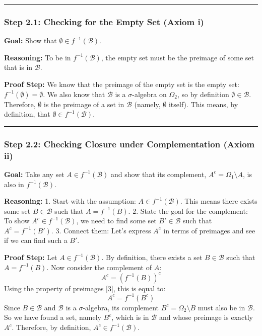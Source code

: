 \documentclass[11pt,a4paper]{article}
\begin{document}
\vspace{1em}
\hrule
\vspace{1em}

\subsubsection*{Step 2.1: Checking for the Empty Set (Axiom i)}
\textbf{Goal:} Show that \(\emptyset \in f^{-1}(\mathcal{B})\).

\textbf{Reasoning:} To be in \(f^{-1}(\mathcal{B})\), the empty set must be the preimage of some set that is in \(\mathcal{B}\).

\textbf{Proof Step:}
We know that the preimage of the empty set is the empty set: \(f^{-1}(\emptyset) = \emptyset\).
We also know that \(\mathcal{B}\) is a \(\sigma\)-algebra on \(\Omega_2\), so by definition \(\emptyset \in \mathcal{B}\).
Therefore, \(\emptyset\) is the preimage of a set in \(\mathcal{B}\) (namely, \(\emptyset\) itself). This means, by definition, that \(\emptyset \in f^{-1}(\mathcal{B})\).

\vspace{1em}
\hrule
\vspace{1em}

\subsubsection*{Step 2.2: Checking Closure under Complementation (Axiom ii)}
\textbf{Goal:} Take any set \(A \in f^{-1}(\mathcal{B})\) and show that its complement, \(A^c = \Omega_1 \setminus A\), is also in \(f^{-1}(\mathcal{B})\).

\textbf{Reasoning:}
1. Start with the assumption: \(A \in f^{-1}(\mathcal{B})\). This means there exists some set \(B \in \mathcal{B}\) such that \(A = f^{-1}(B)\).
2. State the goal for the complement: To show \(A^c \in f^{-1}(\mathcal{B})\), we need to find some set \(B' \in \mathcal{B}\) such that \(A^c = f^{-1}(B')\).
3. Connect them: Let's express \(A^c\) in terms of preimages and see if we can find such a \(B'\).

\textbf{Proof Step:}
Let \(A \in f^{-1}(\mathcal{B})\). By definition, there exists a set \(B \in \mathcal{B}\) such that \(A = f^{-1}(B)\).
Now consider the complement of \(A\):
\[ A^c = \left(f^{-1}(B)\right)^c \]
Using the property of preimages \hyperlink{def:set-properties}{[3]}, this is equal to:
\[ A^c = f^{-1}(B^c) \]
Since \(B \in \mathcal{B}\) and \(\mathcal{B}\) is a \(\sigma\)-algebra, its complement \(B^c = \Omega_2 \setminus B\) must also be in \(\mathcal{B}\).
So we have found a set, namely \(B^c\), which is in \(\mathcal{B}\) and whose preimage is exactly \(A^c\). Therefore, by definition, \(A^c \in f^{-1}(\mathcal{B})\).
\end{document}
